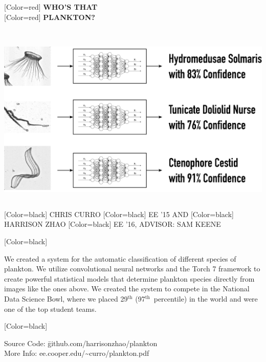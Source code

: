 \documentclass{article}
\begin{document}
\begin{minipage}[c]{20in}
{ 
[Color=red]
\fontsize{3.5in}{0.8in}\selectfont 
\bfseries
WHO'S THAT %
}
\vspace{0.5in}\\ 
{
[Color=red]
\fontsize{3.62in}{0.8in}\selectfont 
\bfseries
PLANKTON?
}
\end{minipage}
\vspace{1in}\\
\colorbox{white}{
\begin{minipage}{21in}
\centering
\includegraphics[width=20in]{figure.pdf}
\end{minipage}
}
\vspace{1in}\\
{
[Color=black]
\fontsize{1in}{1em}\selectfont 
CHRIS CURRO
}
{
[Color=black]
\fontsize{0.8in}{1em}\selectfont 
EE '15 AND
}
{
[Color=black]
\fontsize{1in}{1em}\selectfont 
HARRISON ZHAO
}
{
[Color=black]
\fontsize{0.8in}{1em}\selectfont 
EE '16, ADVISOR: SAM KEENE
}
\vspace{0.8in}\\
\begin{minipage}{12in}
{
	[Color=black]
	\fontsize{0.6in}{6.5em}\selectfont

    We created a system for the automatic classification of different species
	of plankton. We utilize convolutional neural networks and the Torch 7 framework
	to create powerful statistical models that determine plankton species directly from
	images like the ones above. We created the system to compete in the National Data Science Bowl, 
	where we placed 29$^\text{th}$ (97$^\text{th}$~percentile) in the world and were one of the
	top student teams.


} \end{minipage} 
\hfill
\begin{minipage}{11in}
{
	[Color=black]
	\fontsize{0.6in}{6.5em}\selectfont
	\begin{tabbing}
	Source Code: \= github.com/harrisonzhao/plankton \\
	More Info: \> ee.cooper.edu/\textasciitilde{}curro/plankton.pdf
	\end{tabbing}
} 
\end{minipage} 
\end{document}
